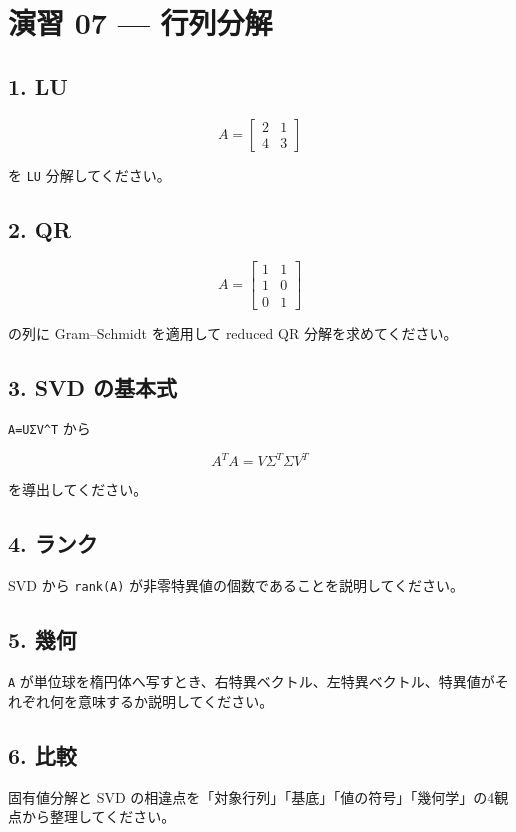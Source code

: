 \documentclass[
  11pt,
  a4paper,
]{ltjsarticle}
\author{}
\date{}
\begin{document}
\hypertarget{ux6f14ux7fd2-07-ux884cux5217ux5206ux89e3}{%
\section{演習 07 ---
行列分解}\label{ux6f14ux7fd2-07-ux884cux5217ux5206ux89e3}}

\hypertarget{lu}{%
\subsection{1. LU}\label{lu}}

\[
A=\begin{bmatrix}2&1\\4&3\end{bmatrix}
\]

を \texttt{LU} 分解してください。

\hypertarget{qr}{%
\subsection{2. QR}\label{qr}}

\[
A=\begin{bmatrix}1&1\\1&0\\0&1\end{bmatrix}
\]

の列に Gram--Schmidt を適用して reduced QR 分解を求めてください。

\hypertarget{svd-ux306eux57faux672cux5f0f}{%
\subsection{3. SVD の基本式}\label{svd-ux306eux57faux672cux5f0f}}

\texttt{A=UΣV\^{}T} から

\[
A^TA=VΣ^TΣV^T
\]

を導出してください。

\hypertarget{ux30e9ux30f3ux30af}{%
\subsection{4. ランク}\label{ux30e9ux30f3ux30af}}

SVD から \texttt{rank(A)}
が非零特異値の個数であることを説明してください。

\hypertarget{ux5e7eux4f55}{%
\subsection{5. 幾何}\label{ux5e7eux4f55}}

\texttt{A}
が単位球を楕円体へ写すとき、右特異ベクトル、左特異ベクトル、特異値がそれぞれ何を意味するか説明してください。

\hypertarget{ux6bd4ux8f03}{%
\subsection{6. 比較}\label{ux6bd4ux8f03}}

固有値分解と SVD
の相違点を「対象行列」「基底」「値の符号」「幾何学」の4観点から整理してください。
\end{document}

